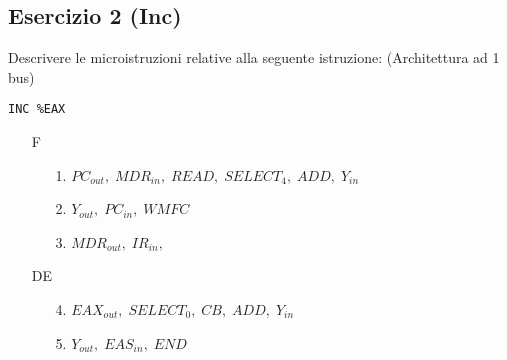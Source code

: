 \documentclass[a4paper]{article}
\theoremstyle{break}
\theoremstyle{break}
\theoremstyle{break}
\theoremstyle{break}
\begin{document}
\subsection{Esercizio 2 (Inc)}
\begin{exercise}
  Descrivere le microistruzioni relative alla seguente istruzione: (Architettura ad 1 bus)
  \begin{center}
    \texttt{INC \%EAX}
  \end{center}

  \begin{enumerate}
    \item [F]
      \begin{enumerate}
        \item [1.] \( PC_{out},\; MDR_{in},\; READ,\; SELECT_4,\; ADD,\; Y_{in} \) 
        \item [2.] \( Y_{out},\; PC_{in},\; WMFC \) 
        \item [3.] \( MDR_{out},\; IR_{in}, \) 
      \end{enumerate}

    \item [DE]
      \begin{enumerate}
        \item [4.] \( EAX_{out},\; SELECT_0,\; CB,\; ADD,\; Y_{in} \) 
        \item [5.] \( Y_{out},\; EAS_{in},\; END \) 
      \end{enumerate}
  \end{enumerate}

\end{exercise}
\end{document}
